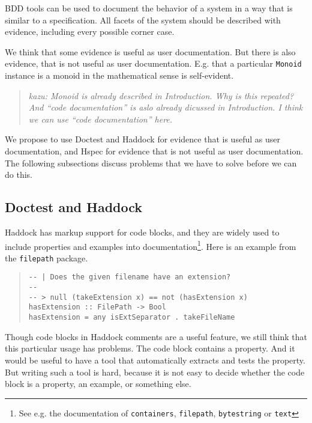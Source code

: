 \documentclass[preprint]{sigplanconf}
\begin{document}
BDD tools can be used to document the behavior of a system in a way that
is similar to a specification.  All facets of the system should be
described with evidence, including every possible corner case.

We think that some evidence is useful as user documentation.
But there is also evidence, that is not
useful as user documentation.  E.g. that a particular \texttt{Monoid}
instance is a monoid in the mathematical sense is self-evident.

\begin{quote}
    \emph{kazu: Monoid is already described in Introduction. Why is this repeated? And ``code documentation'' is aslo already dicussed in Introduction. I think we can use ``code documentation'' here.}
\end{quote}

We propose to use Doctest and Haddock for evidence that is useful as
user documentation, and Hspec for evidence that is not useful as user
documentation.  The following subsections discuss problems that we
have to solve before we can do this.

\subsection{Doctest and Haddock}
\label{sec:doctest-haddock}

Haddock has markup support for code blocks, and they are widely used
to include properties and examples into documentation\footnote{
See e.g. the documentation of
{\tt containers},
{\tt filepath},
{\tt bytestring} or
{\tt text}}.
Here is an example from the {\tt filepath} package.

\begin{quote}
\small
\begin{verbatim}
-- | Does the given filename have an extension?
--
-- > null (takeExtension x) == not (hasExtension x)
hasExtension :: FilePath -> Bool
hasExtension = any isExtSeparator . takeFileName
\end{verbatim}
\end{quote}

\noindent Though code blocks in Haddock comments are a useful feature,
we still think that this particular usage has problems.  The code
block contains a property.  And it would be useful to have a tool that
automatically extracts and tests the property.
But writing such a tool is hard, because it is not easy to decide
whether the code block is a property, an example, or something else.
\end{document}
